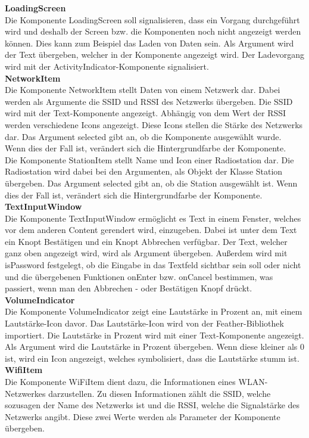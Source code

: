 \documentclass[11pt, twoside]{article}
\begin{document}
\textbf{LoadingScreen} \\
Die Komponente LoadingScreen soll signalisieren, dass ein Vorgang durchgeführt wird und deshalb der Screen bzw. die Komponenten noch nicht angezeigt werden können. Dies kann zum Beispiel das Laden von Daten sein. Als Argument wird der Text übergeben, welcher in der Komponente angezeigt wird. Der Ladevorgang wird mit der ActivityIndicator-Komponente signalisiert. \newline \\
\textbf{NetworkItem} \\
Die Komponente NetworkItem stellt Daten von einem Netzwerk dar. Dabei werden als Argumente die SSID und RSSI des Netzwerks übergeben. Die SSID wird mit der Text-Komponente angezeigt. Abhängig von dem Wert der RSSI werden verschiedene Icons angezeigt. Diese Icons stellen die Stärke des Netzwerks dar. Das Argument selected gibt an, ob die Komponente ausgewählt wurde. Wenn dies der Fall ist, verändert sich die Hintergrundfarbe der Komponente. \newline \\
Die Komponente StationItem stellt Name und Icon einer Radiostation dar. Die Radiostation wird dabei bei den Argumenten, als Objekt der Klasse Station übergeben. Das Argument selected gibt an, ob die Station ausgewählt ist. Wenn dies der Fall ist, verändert sich die Hintergrundfarbe der Komponente. \newline \\
\textbf{TextInputWindow} \\
Die Komponente TextInputWindow ermöglicht es Text in einem Fenster, welches vor dem anderen Content gerendert wird, einzugeben. Dabei ist unter dem Text ein Knopt \glqq Bestätigen \grqq{} und ein Knopt \glqq Abbrechen \grqq{} verfügbar. Der Text, welcher ganz oben angezeigt wird, wird als Argument übergeben. Außerdem wird mit isPassword festgelegt, ob die Eingabe in das Textfeld sichtbar sein soll oder nicht und die übergebenen Funktionen onEnter bzw. onCancel bestimmen, was passiert, wenn man den \glqq Abbrechen \grqq{}- oder \glqq Bestätigen \grqq{} Knopf drückt. \newline \\
\textbf{VolumeIndicator} \\
Die Komponente VolumeIndicator zeigt eine Lautstärke in Prozent an, mit einem Lautstärke-Icon davor. Das Lautstärke-Icon wird von der Feather-Bibliothek importiert. Die Lautstärke in Prozent wird mit einer Text-Komponente angezeigt. Als Argument wird die Lautstärke in Prozent übergeben. Wenn diese kleiner als 0 ist, wird ein Icon angezeigt, welches symbolisiert, dass die Lautstärke stumm ist. \newline \\
\textbf{WifiItem} \\
Die Komponente WiFiItem dient dazu, die Informationen eines WLAN-Netzwerkes darzustellen. Zu diesen Informationen zählt die SSID, welche sozusagen der Name des Netzwerks ist und die RSSI, welche die Signalstärke des Netzwerks angibt. Diese zwei Werte werden als Parameter der Komponente übergeben.
\end{document}
